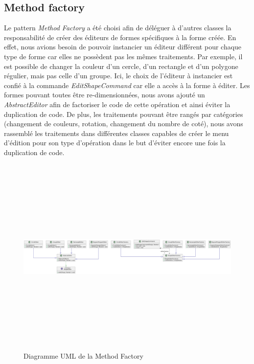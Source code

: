\documentclass{article}
\begin{document}
\subsection{Method factory}
Le pattern \textit{Method Factory} a été choisi afin de déléguer à d'autres classes la responsabilité de créer des éditeurs de formes
spécifiques à la forme créée. En effet, nous avions besoin de pouvoir instancier un éditeur différent pour chaque type de forme car elles
ne possèdent pas les mêmes traitements. Par exemple, il est possible de changer la couleur d'un cercle, d'un rectangle et d'un polygone régulier, mais pas celle d'un groupe.
Ici, le choix de l'éditeur à instancier est confié à la commande \textit{EditShapeCommand} car elle a accès à la forme à éditer. Les formes pouvant toutes
être re-dimensionnées, nous avons ajouté un \textit{AbstractEditor} afin de factoriser le code de cette opération et ainsi éviter la duplication de code.
De plus, les traitements pouvant être rangés par catégories (changement de couleurs, rotation, changement du nombre de coté), nous avons rassemblé les traitements
dans différentes classes capables de créer le menu d'édition pour son type d'opération dans le but d'éviter encore une fois la duplication de code.
\begin{figure}[h]
    \centering
    \includegraphics[width=\textwidth,height=10.0cm,keepaspectratio]{methodFactory.png}
    \caption{Diagramme UML de la Method Factory}
    \label{MethodFactory}
\end{figure}
\FloatBarrier
\end{document}
